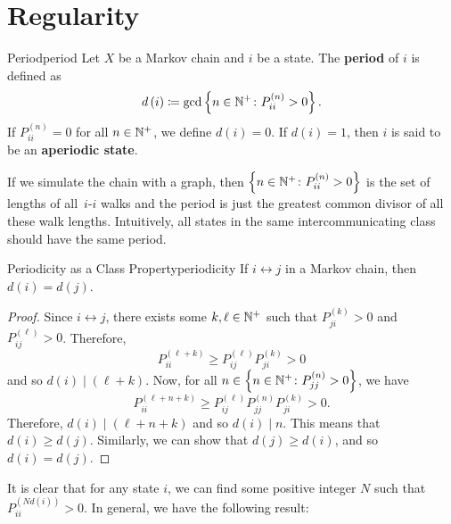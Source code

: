 \documentclass[math, code]{amznotes}
\theoremstyle{remark}
\begin{document}
\section{Regularity}
\begin{dfnbox}{Period}{period}
    Let $X$ be a Markov chain and $i$ be a state. The {\color{red} \textbf{period}} of $i$ is defined as
    \begin{equation*}
        d\left(i\right) \coloneqq \gcd\left\{n \in \mathbb{N}^+ \colon P_{ii}^{\left(n\right)} > 0\right\}.
    \end{equation*}
    If $P_{ii}^{\left(n\right)} = 0$ for all $n \in \mathbb{N}^+$, we define $d\left(i\right) = 0$. If $d\left(i\right) = 1$, then $i$ is said to be an {\color{red} \textbf{aperiodic state}}.
\end{dfnbox}
If we simulate the chain with a graph, then $\left\{n \in \mathbb{N}^+ \colon P_{ii}^{\left(n\right)} > 0\right\}$ is the set of lengths of all~$i$-$i$ walks and the period is just the greatest common divisor of all these walk lengths. Intuitively, all states in the same intercommunicating class should have the same period.
\begin{probox}{Periodicity as a Class Property}{periodicity}
    If $i \leftrightarrow j$ in a Markov chain, then $d\left(i\right) = d\left(j\right)$.
    \tcblower
    \begin{proof}
        Since $i \leftrightarrow j$, there exists some $k, \ell \in \mathbb{N}^+$ such that $P_{ji}^{\left(k\right)} > 0$ and $P_{ij}^{\left(\ell\right)} > 0$. Therefore, 
        \begin{equation*}
            P_{ii}^{\left(\ell + k\right)} \geq P_{ij}^{\left(\ell\right)}P_{ji}^{\left(k\right)} > 0
        \end{equation*}
        and so $d\left(i\right) \mid \left(\ell + k\right)$. Now, for all $n \in \left\{n \in \mathbb{N}^+ \colon P_{jj}^{\left(n\right)} > 0\right\}$, we have 
        \begin{equation*}
            P_{ii}^{\left(\ell + n + k\right)} \geq  P_{ij}^{\left(\ell\right)}P_{jj}^{\left(n\right)}P_{ji}^{\left(k\right)} > 0.
        \end{equation*}
        Therefore, $d\left(i\right) \mid \left(\ell + n + k\right)$ and so $d\left(i\right) \mid n$. This means that $d\left(i\right) \geq d\left(j\right)$. Similarly, we can show that $d\left(j\right) \geq d\left(i\right)$, and so $d\left(i\right) = d\left(j\right)$.
    \end{proof}
\end{probox}
It is clear that for any state $i$, we can find some positive integer $N$ such that $P^{\left(Nd\left(i\right)\right)}_{ii} > 0$. In general, we have the following result:
\end{document}
